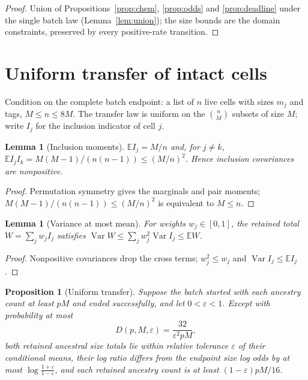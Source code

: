\documentclass[11pt,a4paper]{article}
\theoremstyle{plain}
\newtheorem{proposition}[theorem]{Proposition}
\newtheorem{lemma}[theorem]{Lemma}
\theoremstyle{definition}
\theoremstyle{remark}
\newcommand{\E}{\mathbb E}
\newcommand{\eps}{\varepsilon}
\newcommand{\Var}{\operatorname{Var}}
\begin{document}
\begin{proof}
Union of Propositions~\ref{prop:chem}, \ref{prop:odds} and \ref{prop:deadline} under the single batch law (Lemma~\ref{lem:union}); the size bounds are the domain constraints, preserved by every positive-rate transition.
\end{proof}

\section{Uniform transfer of intact cells}\label{sec:transfer}

Condition on the complete batch endpoint: a list of $n$ live cells with sizes $m_j$ and tags, $M\le n\le8M$. The transfer law is uniform on the $\binom nM$ subsets of size $M$; write $I_j$ for the inclusion indicator of cell $j$.

\begin{lemma}[Inclusion moments]\label{lem:moments}
$\E I_j=M/n$ and, for $j\ne k$, $\E I_jI_k=M(M-1)/(n(n-1))\le(M/n)^2$. Hence inclusion covariances are nonpositive.
\end{lemma}

\begin{proof}
Permutation symmetry gives the marginals and pair moments; $M(M-1)/(n(n-1))\le(M/n)^2$ is equivalent to $M\le n$.
\end{proof}

\begin{lemma}[Variance at most mean]\label{lem:variance}
For weights $w_j\in[0,1]$, the retained total $W=\sum_jw_jI_j$ satisfies $\Var W\le\sum_jw_j^2\Var I_j\le\E W$.
\end{lemma}

\begin{proof}
Nonpositive covariances drop the cross terms; $w_j^2\le w_j$ and $\Var I_j\le\E I_j$.
\end{proof}

\begin{proposition}[Uniform transfer]\label{prop:transfer}
Suppose the batch started with each ancestry count at least $pM$ and ended successfully, and let $0<\eps<1$. Except with probability at most
\begin{equation}\label{eq:transfer}
D(p,M,\eps)=\frac{32}{\eps^2pM},
\end{equation}
both retained ancestral size totals lie within relative tolerance $\eps$ of their conditional means, their log ratio differs from the endpoint size log odds by at most $\log\frac{1+\eps}{1-\eps}$, and each retained ancestry count is at least $(1-\eps)pM/16$.
\end{proposition}
\end{document}
